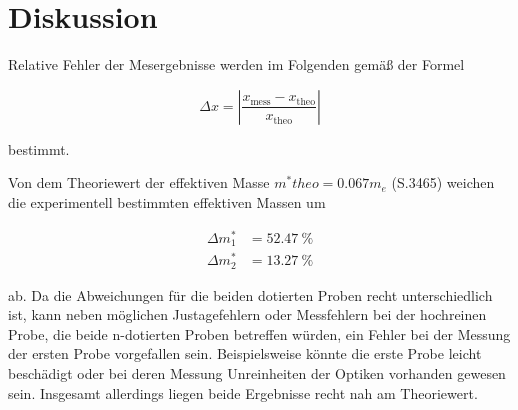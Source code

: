 \section{Diskussion}
\label{sec:Diskussion}

Relative Fehler der Mesergebnisse werden im Folgenden gemäß der Formel

\begin{equation}
    \Delta x = \left| \frac{x_\text{mess} - x_\text{theo}}{x_\text{theo}}\right|
\end{equation}

bestimmt. 

Von dem Theoriewert der effektiven Masse $m^*{theo} = \num{0.067}m_e$ \cite{Theo} (S.3465)
weichen die experimentell bestimmten effektiven Massen um

\begin{align*}
    \Delta m^*_1 &= \SI{52.47}{\percent} \\
    \Delta m^*_2 &= \SI{13.27}{\percent}
\end{align*}

ab.
Da die Abweichungen für die beiden dotierten Proben recht unterschiedlich ist, kann neben möglichen Justagefehlern oder
Messfehlern bei der hochreinen Probe, die beide n-dotierten Proben betreffen würden, ein Fehler bei der Messung der ersten 
Probe vorgefallen sein. Beispielsweise könnte die erste Probe leicht beschädigt oder bei deren Messung Unreinheiten der Optiken
vorhanden gewesen sein. Insgesamt allerdings liegen beide Ergebnisse recht nah am Theoriewert.